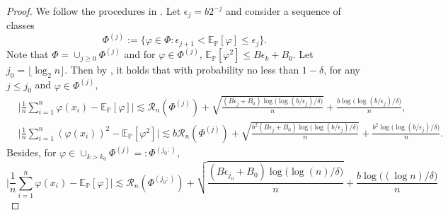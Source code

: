 \documentclass{article}
\numberwithin{equation}{section}
\newcommand{\E}{\mathbb{E}}
\theoremstyle{definition}
\renewcommand{\P}{\mathbb{P}}
\begin{document}
\begin{proof}
    We follow the procedures in \citet{bousquet2002concentration}.
    Let $\epsilon_j=b2^{-j}$ and consider a sequence of classes
    \begin{equation}
        \Phi^{(j)}:=\{\varphi\in\Phi: \epsilon_{j+1}<\E_\P[\varphi] \leq \epsilon_j\}.
    \end{equation}
    Note that $\Phi=\cup_{j\geq 0}\Phi^{(j)}$ and for $\varphi\in\Phi^{(j)}$, $\E_\P[\varphi^2]\leq B\epsilon_k+B_0$.
    Let $j_0=\lfloor\log_2 n\rfloor$.
    Then by \citet[Lemma 6.1]{bousquet2002concentration}, it holds that with probability no less than $1-\delta$, for any $j\leq j_0$ and $\varphi\in\Phi^{(j)}$,
    \begin{align}
        &\Big|\frac{1}{n}\sum_{i=1}^n\varphi(x_i)-\E_\P[\varphi]\Big|\lesssim \mathcal{R}_n(\Phi^{(j)})+\sqrt{\frac{(B\epsilon_j+B_0)\log\big(\log(b/\epsilon_j)/\delta\big)}{n}} + \frac{b\log\big(\log(b/\epsilon_j)/\delta\big)}{n}, \label{eq:rademacher_1}\\
        &\Big|\frac{1}{n}\sum_{i=1}^n(\varphi(x_i))^2-\E_\P[\varphi^2]\Big|\lesssim b\mathcal{R}_n(\Phi^{(j)})+\sqrt{\frac{b^2(B\epsilon_j+B_0)\log\big(\log(b/\epsilon_j)/\delta\big)}{n}} + \frac{b^2\log\big(\log(b/\epsilon_j)/\delta\big)}{n}. \label{eq:rademacher_2}
    \end{align}
    Besides, for $\varphi\in\cup_{k>k_0}\Phi^{(j)}=:\Phi^{(j_0:)}$,
    \begin{equation}\label{eq:rademacher_3}
        \Big|\frac{1}{n}\sum_{i=1}^n\varphi(x_i)-\E_\P[\varphi]\Big|\lesssim \mathcal{R}_n(\Phi^{(j_0:)})+\sqrt{\frac{(B\epsilon_{j_0}+B_0)\log\big(\log(n)/\delta\big)}{n}} + \frac{b\log\big((\log n)/\delta\big)}{n}
    \end{equation}
    

\end{proof}
\end{document}
